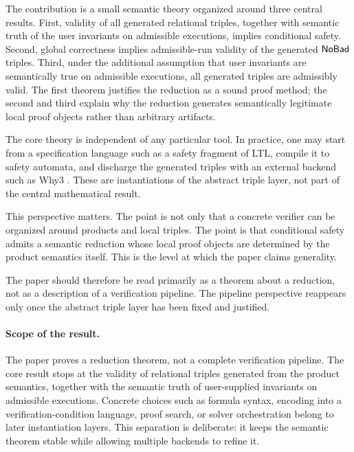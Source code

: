 \documentclass[acmsmall,screen]{acmart}
\theoremstyle{leftplain}
\theoremstyle{leftdefinition}
\theoremstyle{leftremark}
\begin{document}
The contribution is a small semantic theory organized around three central
results. First, validity of all generated relational triples, together with
semantic truth of the user invariants on admissible executions, implies
conditional safety. Second, global correctness implies admissible-run validity
of the generated $\mathsf{NoBad}$ triples. Third, under the additional assumption that
user invariants are semantically true on admissible executions, all generated
triples are admissibly valid. The first theorem justifies the reduction as a
sound proof method; the second and third explain why the reduction generates
semantically legitimate local proof objects rather than arbitrary artifacts.

The core theory is independent of any particular tool. In practice, one may
start from a specification language such as a safety fragment of LTL, compile
it to safety automata, and discharge the generated triples with an external
backend such as Why3 \cite{why3}. These are instantiations of the abstract
triple layer, not part of the central mathematical result.

This perspective matters. The point is not only that a concrete verifier can be
organized around products and local triples. The point is that conditional
safety admits a semantic reduction whose local proof objects are determined by
the product semantics itself. This is the level at which the paper claims
generality.

The paper should therefore be read primarily as a theorem about a reduction,
not as a description of a verification pipeline. The pipeline perspective
reappears only once the abstract triple layer has been fixed and justified.

\paragraph{Scope of the result.}
The paper proves a reduction theorem, not a complete verification pipeline. The
core result stops at the validity of relational triples generated from the
product semantics, together with the semantic truth of user-supplied
invariants on admissible executions. Concrete choices such as formula syntax, encoding
into a verification-condition language, proof search, or solver orchestration
belong to later instantiation layers. This separation is deliberate: it keeps
the semantic theorem stable while allowing multiple backends to refine it.
\end{document}
